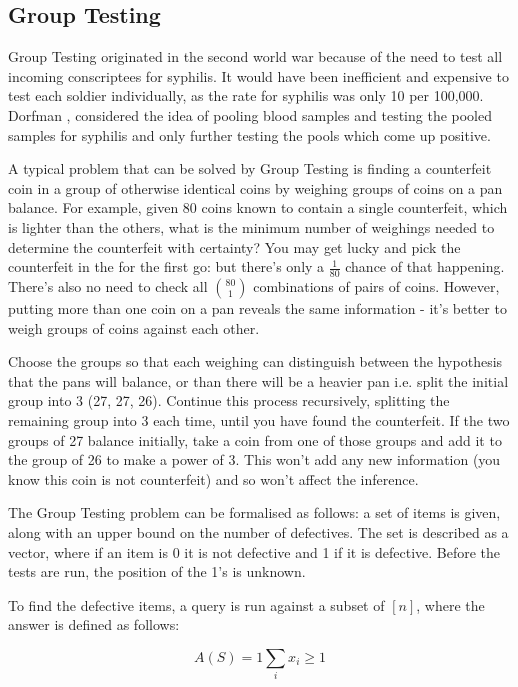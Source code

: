 \documentclass[12pt, a4paper]{article}
\begin{document}
\subsection{Group Testing}
Group Testing originated in the second world war because of the need to test all incoming conscriptees for syphilis. It would have been inefficient and expensive to test each soldier individually, as the rate for syphilis was only 10 per 100,000. Dorfman \cite{Dorfman1943}, considered the idea of pooling blood samples and testing the pooled samples for syphilis and only further testing the pools which come up positive.

A typical problem that can be solved by Group Testing is finding a counterfeit coin in a group of otherwise identical coins by weighing groups of coins on a pan balance. For example, given 80 coins known to contain a single counterfeit, which is lighter than the others, what is the minimum number of weighings needed to determine the counterfeit with certainty? You may get lucky and pick the counterfeit in the for the first go: but there's only a \(\frac{1}{80}\) chance of that happening. There's also no need to check all \(80 \choose 1\) combinations of pairs of coins. However, putting more than one coin on a pan reveals the same information  - it's better to weigh groups of coins against each other.

Choose the groups so that each weighing can distinguish between the hypothesis that the pans will balance, or than there will be a heavier pan i.e. split the initial group into 3 (27, 27, 26). Continue this process recursively, splitting the remaining group into 3 each time, until you have found the counterfeit. If the two groups of 27 balance initially, take a coin from one of those groups and add it to the group of 26 to make a power of 3. This won't add any new information (you know this coin is not counterfeit) and so won't affect the inference.

The Group Testing problem can be formalised as follows: a set of items is given, along with an upper bound on the number of defectives. The set is described as a vector, where if an item is 0 it is not defective and 1 if it is defective. Before the tests are run, the position of the 1's is unknown. 

To find the defective items, a query is run against a subset of \([n]\), where the answer is defined as follows:

\begin{equation}
A\left(S\right) = 1 \sum_{i} x_i \geq 1
\end{equation}
\end{document}

